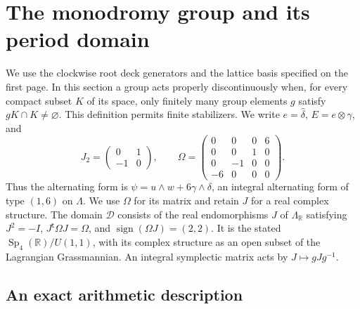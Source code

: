\section{The monodromy group and its period domain}\hypertarget{tag-01PV}{}\label{fam:section:F}

We use the clockwise root deck generators and the lattice basis specified
on the first page.  In this section a group acts properly discontinuously when, for every
compact subset $K$ of its space, only finitely many group elements $g$ satisfy
$gK\cap K\ne\varnothing$.  This definition permits finite stabilizers.  We
write $e=\widehat\delta$, $E=e\otimes\gamma$, and
\[
 J_2=\begin{pmatrix}0&1\\-1&0\end{pmatrix},\qquad
 \Omega=\begin{pmatrix}
 0&0&0&6\\0&0&1&0\\0&-1&0&0\\-6&0&0&0
 \end{pmatrix}.
\]
Thus the alternating form is
$\psi=u\wedge w+6\gamma\wedge\delta$, an integral alternating form of
type $(1,6)$ on $\Lambda$.  We use $\Omega$ for its matrix and retain $J$ for
a real complex structure.  The domain $\mathcal D$ consists of the real
endomorphisms $J$ of $\Lambda_{\mathbb R}$ satisfying
$J^2=-I$, $J^{\mathsf t}\Omega J=\Omega$, and
$\operatorname{sign}(\Omega J)=(2,2)$.  It is the stated
$\operatorname{Sp}_4(\mathbb R)/U(1,1)$, with its complex structure as an
open subset of the Lagrangian Grassmannian.  An integral symplectic matrix
acts by $J\mapsto gJg^{-1}$.

\subsection{An exact arithmetic description}\hypertarget{tag-01PW}{}\label{fam:section:F.1}

